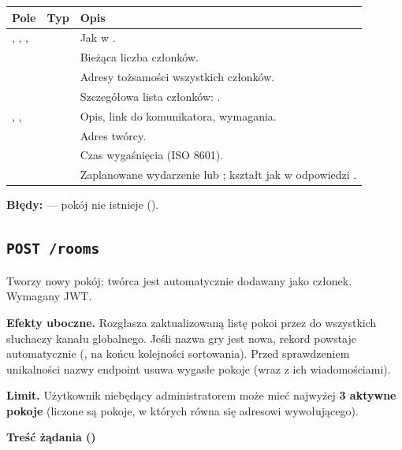 \begin{tabularx}{\textwidth}{llY}
\toprule
Pole & Typ & Opis \\
\midrule
{}, , ,  & & Jak w . \\
 &  & Bieżąca liczba członków. \\
 &  & Adresy tożsamości wszystkich członków. \\
 &  & Szczegółowa lista członków: . \\
, ,  &  & Opis, link do komunikatora, wymagania. \\
 &  & Adres twórcy. \\
 &  & Czas wygaśnięcia (ISO 8601). \\
 &  & Zaplanowane wydarzenie lub ; kształt jak w odpowiedzi . \\
\bottomrule
\end{tabularx}

\textbf{Błędy:}  --- pokój nie istnieje ().

\subsection{\texttt{POST /rooms}}

Tworzy nowy pokój; twórca jest automatycznie dodawany jako członek. Wymagany JWT.

\textbf{Efekty uboczne.} Rozgłasza zaktualizowaną listę pokoi przez  do wszystkich
słuchaczy kanału globalnego. Jeśli nazwa gry jest nowa, rekord  powstaje automatycznie
(, na końcu kolejności sortowania). Przed sprawdzeniem unikalności nazwy
endpoint usuwa wygasłe pokoje (wraz z ich wiadomościami).

\textbf{Limit.} Użytkownik niebędący administratorem może mieć najwyżej \textbf{3 aktywne pokoje}
(liczone są pokoje, w których  równa się adresowi wywołującego).

\textbf{Treść żądania ()}

